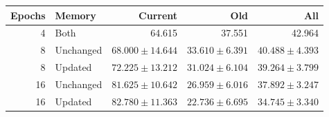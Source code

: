\begin{tabular}{rlrrr}
\toprule
Epochs & Memory & Current & Old & All\\
\midrule
4 & Both & 64.615 & 37.551 & 42.964\\
8 & Unchanged & $68.000\pm14.644$ & $33.610\pm6.391$ & $40.488\pm4.393$\\
8 & Updated & $72.225\pm13.212$ & $31.024\pm6.104$ & $39.264\pm3.799$\\
16 & Unchanged & $81.625\pm10.642$ & $26.959\pm6.016$ & $37.892\pm3.247$\\
16 & Updated & $82.780\pm11.363$ & $22.736\pm6.695$ & $34.745\pm3.340$\\
\bottomrule
\end{tabular}
